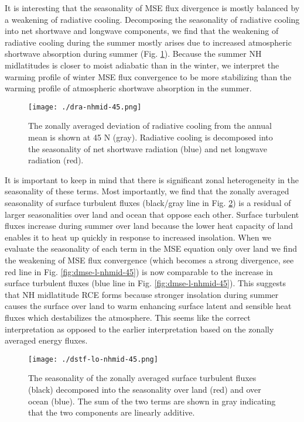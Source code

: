 \documentclass[11pt]{article}
\begin{document}
It is interesting that the seasonality of MSE flux divergence is mostly balanced by a weakening of radiative cooling. Decomposing the seasonality of radiative cooling into net shortwave and longwave components, we find that the weakening of radiative cooling during the summer mostly arises due to increased atmospheric shortwave absorption during summer (Fig. \ref{fig:dra-nhmid-45}). Because the summer NH midlatitudes is closer to moist adiabatic than in the winter, we interpret the warming profile of winter MSE flux convergence to be more stabilizing than the warming profile of atmospheric shortwave absorption in the summer.

\begin{figure}[htbp]
\centering
\texttt{[image: ./dra-nhmid-45.png]}
\caption{\label{fig:dra-nhmid-45}The zonally averaged deviation of radiative cooling from the annual mean is shown at 45 N (gray). Radiative cooling is decomposed into the seasonality of net shortwave radiation (blue) and net longwave radiation (red).}
\end{figure}

It is important to keep in mind that there is significant zonal heterogeneity in the seasonality of these terms. Most importantly, we find that the zonally averaged seasonality of surface turbulent fluxes (black/gray line in Fig. \ref{fig:dstf-lo-nhmid-45}) is a residual of larger seasonalities over land and ocean that oppose each other. Surface turbulent fluxes increase during summer over land because the lower heat capacity of land enables it to heat up quickly in response to increased insolation. When we evaluate the seasonality of each term in the MSE equation only over land we find the weakening of MSE flux convergence (which becomes a strong divergence, see red line in Fig. \ref{fig:dmse-l-nhmid-45}) is now comparable to the increase in surface turbulent fluxes (blue line in Fig. \ref{fig:dmse-l-nhmid-45}). This suggests that NH midlatitude RCE forms because stronger insolation during summer causes the surface over land to warm enhancing surface latent and sensible heat fluxes which destabilizes the atmosphere. This seems like the correct interpretation as opposed to the earlier interpretation based on the zonally averaged energy fluxes.

\begin{figure}[htbp]
\centering
\texttt{[image: ./dstf-lo-nhmid-45.png]}
\caption{\label{fig:dstf-lo-nhmid-45}The seasonality of the zonally averaged surface turbulent fluxes (black) decomposed into the seasonality over land (red) and over ocean (blue). The sum of the two terms are shown in gray indicating that the two components are linearly additive.}
\end{figure}
\end{document}
